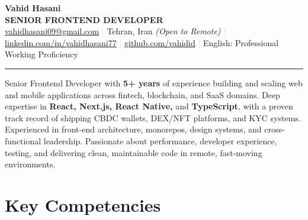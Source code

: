 \documentclass[10pt, a4paper]{article}
\begin{document}

\begin{center}
  {\fontsize{28}{32}\bfseries\color{darkgray} Vahid Hasani}\\[3pt]
  {\large\color{accent}\textbf{SENIOR FRONTEND DEVELOPER}}\\[6pt]
  {\small
    \href{mailto:vahidhasani09@gmail.com}{vahidhasani09@gmail.com}
    \;\textcolor{lightgray}{|}\;
    Tehran, Iran \textit{(Open to Remote)}
    \;\textcolor{lightgray}{|}\;
    \href{https://www.linkedin.com/in/vahidhasani77}{linkedin.com/in/vahidhasani77}
    \;\textcolor{lightgray}{|}\;
    \href{https://github.com/vahidid}{github.com/vahidid}
    \;\textcolor{lightgray}{|}\;
    English: Professional Working Proficiency
  }
\end{center}

\vspace{2pt}
\noindent\textcolor{lightgray}{\hrule}
\vspace{6pt}

\noindent
Senior Frontend Developer with \textbf{5+ years} of experience building and scaling web and mobile
applications across fintech, blockchain, and SaaS domains. Deep expertise in \textbf{React, Next.js,
React Native,} and \textbf{TypeScript}, with a proven track record of shipping CBDC wallets, DEX/NFT
platforms, and KYC systems. Experienced in front-end architecture, monorepos, design systems, and
cross-functional leadership. Passionate about performance, developer experience, testing, and delivering
clean, maintainable code in remote, fast-moving environments.

\vspace{4pt}

\section{Key Competencies}
\end{document}

